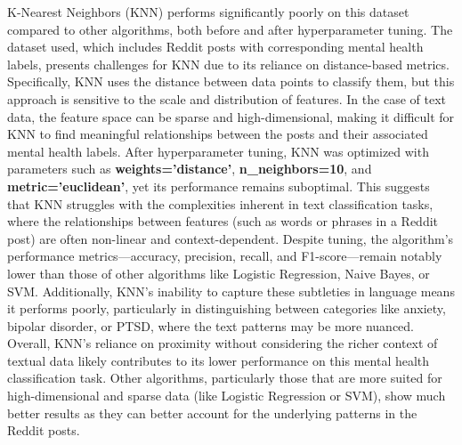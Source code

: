 \noindent 
K-Nearest Neighbors (KNN) performs significantly poorly on this dataset compared to other algorithms, both before and after hyperparameter tuning. The dataset used, which includes Reddit posts with corresponding mental health labels, presents challenges for KNN due to its reliance on distance-based metrics. Specifically, KNN uses the distance between data points to classify them, but this approach is sensitive to the scale and distribution of features. In the case of text data, the feature space can be sparse and high-dimensional, making it difficult for KNN to find meaningful relationships between the posts and their associated mental health labels. After hyperparameter tuning, KNN was optimized with parameters such as \textbf{weights='distance'}, \textbf{n\_neighbors=10}, and \textbf{metric='euclidean'}, yet its performance remains suboptimal. This suggests that KNN struggles with the complexities inherent in text classification tasks, where the relationships between features (such as words or phrases in a Reddit post) are often non-linear and context-dependent. Despite tuning, the algorithm's performance metrics—accuracy, precision, recall, and F1-score—remain notably lower than those of other algorithms like Logistic Regression, Naive Bayes, or SVM. Additionally, KNN's inability to capture these subtleties in language means it performs poorly, particularly in distinguishing between categories like anxiety, bipolar disorder, or PTSD, where the text patterns may be more nuanced. Overall, KNN's reliance on proximity without considering the richer context of textual data likely contributes to its lower performance on this mental health classification task. Other algorithms, particularly those that are more suited for high-dimensional and sparse data (like Logistic Regression or SVM), show much better results as they can better account for the underlying patterns in the Reddit posts.

\pagebreak

